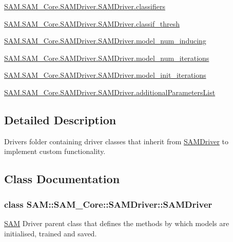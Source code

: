 \begin{DoxyCompactItemize}
\item 
\hyperlink{group__icubclient__SAM__Drivers_gabe6b807db021be28e71f027af8123925}{S\+A\+M.\+S\+A\+M\+\_\+\+Core.\+S\+A\+M\+Driver.\+S\+A\+M\+Driver.\+classifiers}
\item 
\hyperlink{group__icubclient__SAM__Drivers_gac5a03c4fd8cc77e66e3b990cde23ce81}{S\+A\+M.\+S\+A\+M\+\_\+\+Core.\+S\+A\+M\+Driver.\+S\+A\+M\+Driver.\+classif\+\_\+thresh}
\item 
\hyperlink{group__icubclient__SAM__Drivers_ga3c0dc0cea69b59e7bf3e2bf21d098d7f}{S\+A\+M.\+S\+A\+M\+\_\+\+Core.\+S\+A\+M\+Driver.\+S\+A\+M\+Driver.\+model\+\_\+num\+\_\+inducing}
\item 
\hyperlink{group__icubclient__SAM__Drivers_gad641973a96f09f2047d0410e31bc609c}{S\+A\+M.\+S\+A\+M\+\_\+\+Core.\+S\+A\+M\+Driver.\+S\+A\+M\+Driver.\+model\+\_\+num\+\_\+iterations}
\item 
\hyperlink{group__icubclient__SAM__Drivers_ga058fd6bcc38278be395e94cad6db2729}{S\+A\+M.\+S\+A\+M\+\_\+\+Core.\+S\+A\+M\+Driver.\+S\+A\+M\+Driver.\+model\+\_\+init\+\_\+iterations}
\item 
\hyperlink{group__icubclient__SAM__Drivers_gaba1d7355c9842c5ea5881fc9926c06bf}{S\+A\+M.\+S\+A\+M\+\_\+\+Core.\+S\+A\+M\+Driver.\+S\+A\+M\+Driver.\+additional\+Parameters\+List}
\end{DoxyCompactItemize}


\subsection{Detailed Description}
Drivers folder containing driver classes that inherit from \hyperlink{group__icubclient__SAM__Drivers_classSAM_1_1SAM__Core_1_1SAMDriver_1_1SAMDriver}{S\+A\+M\+Driver} to implement custom functionality. 



\subsection{Class Documentation}
\label{classSAM_1_1SAM__Core_1_1SAMDriver_1_1SAMDriver}
\subsubsection{class S\+AM\+:\+:S\+A\+M\+\_\+\+Core\+:\+:S\+A\+M\+Driver\+:\+:S\+A\+M\+Driver}
\hyperlink{namespaceSAM}{S\+AM} Driver parent class that defines the methods by which models are initialised, trained and saved. 

